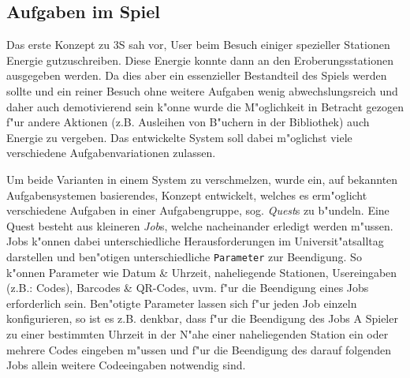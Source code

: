 \documentclass{article}
\begin{document}
\subsection{Aufgaben im Spiel}
\label{subsec:questsystem}
Das erste Konzept zu 3S sah vor, User beim Besuch einiger spezieller Stationen Energie gutzuschreiben. Diese Energie konnte dann an den Eroberungsstationen ausgegeben werden. Da dies aber ein essenzieller Bestandteil des Spiels werden sollte und ein reiner Besuch ohne weitere Aufgaben wenig abwechslungsreich und daher auch demotivierend sein k"onne wurde die M"oglichkeit in Betracht gezogen f"ur andere Aktionen (z.B. Ausleihen von B"uchern in der Bibliothek) auch Energie zu vergeben. Das entwickelte System soll dabei m"oglichst viele verschiedene Aufgabenvariationen zulassen.

Um beide Varianten in einem System zu verschmelzen, wurde ein, auf bekannten Aufgabensystemen basierendes, Konzept entwickelt, welches es erm"oglicht verschiedene Aufgaben in einer Aufgabengruppe, sog. \textit{Quest}s zu b"undeln. Eine Quest besteht aus kleineren \textit{Job}s, welche nacheinander erledigt werden m"ussen. Jobs k"onnen dabei unterschiedliche Herausforderungen im Universit"atsalltag darstellen und ben"otigen unterschiedliche \texttt{Parameter} zur Beendigung. So k"onnen Parameter wie Datum \& Uhrzeit, naheliegende Stationen, Usereingaben (z.B.: Codes), Barcodes \& QR-Codes, uvm. f"ur die Beendigung eines Jobs erforderlich sein. Ben"otigte Parameter lassen sich f"ur jeden Job einzeln konfigurieren, so ist es z.B. denkbar, dass f"ur die Beendigung des Jobs A Spieler zu einer bestimmten Uhrzeit in der N"ahe einer naheliegenden Station ein oder mehrere Codes eingeben m"ussen und f"ur die Beendigung des darauf folgenden Jobs allein weitere Codeeingaben notwendig sind. 
\end{document}
